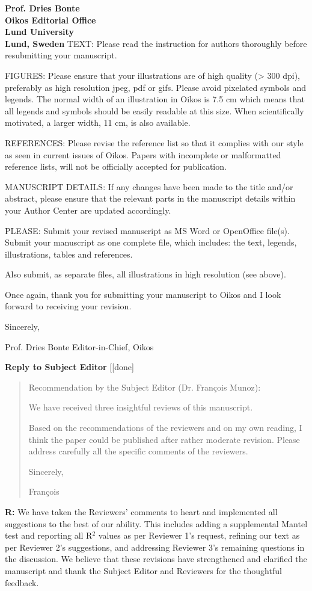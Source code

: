 \documentclass[12pt]{letter}
\begin{document}
\begin{letter}{\bf Prof. Dries Bonte\\
Oikos Editorial Office \\
Lund University \\
Lund, Sweden}
TEXT: Please read the instruction for authors thoroughly before resubmitting your manuscript.

FIGURES: Please ensure that your illustrations are of high quality (> 300 dpi), preferably as high resolution jpeg, pdf or gifs. Please avoid pixelated symbols and legends. The normal width of an illustration in Oikos is 7.5 cm which means that all legends and symbols should be easily readable at this size. When scientifically motivated, a larger width, 11 cm, is also available.

REFERENCES: Please revise the reference list so that it complies with our style as seen in current issues of Oikos. Papers with incomplete or malformatted reference lists, will not be officially accepted for publication.

MANUSCRIPT DETAILS: If any changes have been made to the title and/or abstract, please ensure that the relevant parts in the manuscript details within your Author Center are updated accordingly.

PLEASE: Submit your revised manuscript as MS Word or OpenOffice file(s). Submit your manuscript as one complete file, which includes: the text, legends, illustrations, tables and references.

Also submit, as separate files, all illustrations in high resolution (see above).

Once again, thank you for submitting your manuscript to Oikos and I look forward to receiving your revision.

Sincerely,

Prof. Dries Bonte
Editor-in-Chief, Oikos


\clearpage

{\large \textbf{Reply to Subject Editor}} [[done]

  \begin{quotation}
    Recommendation by the Subject Editor (Dr. Fran\c{c}ois Munoz):

    We have received three insightful reviews of this manuscript.

    Based on the recommendations of the reviewers and on my own reading, I think the paper could be published after rather moderate revision. Please address carefully all the specific comments of the reviewers.

    Sincerely,

    Fran\c{c}ois
  \end{quotation}

  
  \textbf{R:} We have taken the Reviewers' comments to heart and implemented all suggestions to the best of our ability. This includes adding a supplemental Mantel test and reporting all R$^2$ values as per Reviewer 1's request, refining our text as per Reviewer 2's suggestions, and addressing Reviewer 3's remaining questions in the discussion. We believe that these revisions have strengthened and clarified the manuscript and thank the Subject Editor and Reviewers for the thoughtful feedback.



\end{letter}
\end{document}
